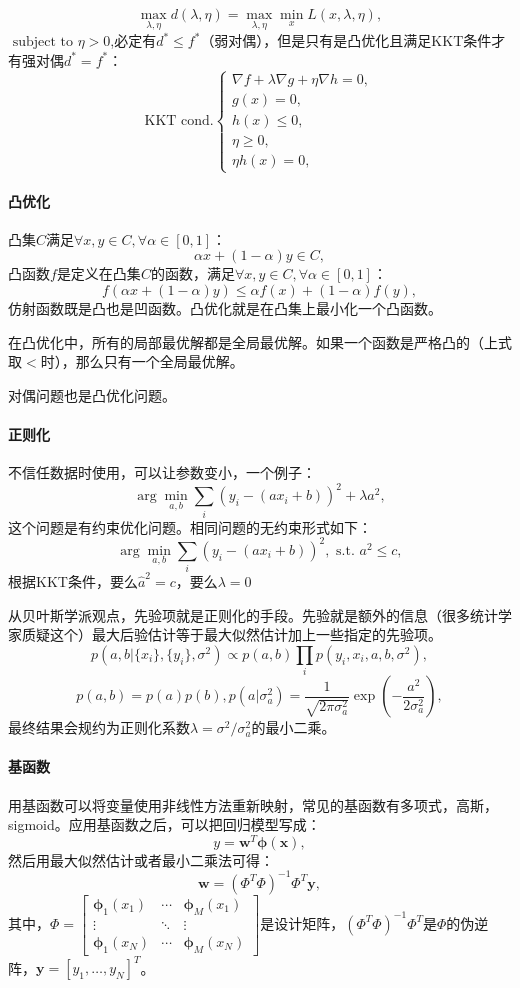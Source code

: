 $$\max_{\lambda,\eta} d(\lambda,\eta)=\max_{\lambda,\eta}\min_xL(x,\lambda,\eta),$$
$\text{ subject to }\eta>0$,必定有$d^*\le f^*$（弱对偶），但是只有是凸优化且满足KKT条件才有强对偶$d^* = f^*$：
$$\text{KKT cond.} \left\{\begin{array}{l}
\nabla f + \lambda\nabla g + \eta\nabla h = 0, \\
g(x) = 0, \\
h(x) \le 0, \\
\eta \ge 0, \\
\eta h(x) = 0,
\end{array} \right.$$

\paragraph{凸优化} 凸集$C$满足$\forall x,y \in C, \forall \alpha \in [0,1]$：
$$\alpha x + (1-\alpha)y \in C,$$
凸函数$f$是定义在凸集$C$的函数，满足$\forall x,y \in C, \forall \alpha \in [0,1]$：
$$f(\alpha x + (1-\alpha)y) \le \alpha f(x) + (1-\alpha)f(y),$$
仿射函数既是凸也是凹函数。凸优化就是在凸集上最小化一个凸函数。

在凸优化中，所有的局部最优解都是全局最优解。如果一个函数是严格凸的（上式取$<$时），那么只有一个全局最优解。

对偶问题也是凸优化问题。

\paragraph{正则化} 不信任数据时使用，可以让参数变小，一个例子：$$\arg\min_{a,b}\sum_i(y_i-(ax_i + b))^2+\lambda a^2,$$
这个问题是有约束优化问题。相同问题的无约束形式如下：
$$\arg\min_{a,b}\sum_i(y_i-(ax_i + b))^2,\text{ s.t. }a^2 \le c,$$根据KKT条件，要么$\hat{a}^2 = c$，要么$\lambda = 0$

从贝叶斯学派观点，先验项就是正则化的手段。先验就是额外的信息（很多统计学家质疑这个）最大后验估计等于最大似然估计加上一些指定的先验项。
$$p(a,b|\{x_i\}, \{y_i\}, \sigma^2) \propto p(a,b) \prod_i p(y_i, x_i, a, b, \sigma^2),$$
$$p(a,b) = p(a)p(b), p(a|\sigma_a^2) = \frac{1}{\sqrt{2\pi\sigma_a^2}}\exp(-\frac{a^2}{2\sigma_a^2}),$$
最终结果会规约为正则化系数$\lambda = \sigma^2/\sigma_a^2$的最小二乘。

\paragraph{基函数}
用基函数可以将变量使用非线性方法重新映射，常见的基函数有多项式，高斯，sigmoid。应用基函数之后，可以把回归模型写成：
$$y = \bm{w}^T\bm\phi(\bm{x}),$$
然后用最大似然估计或者最小二乘法可得：
$$\bm w = (\Phi^T\Phi)^{-1}\Phi^T\bm y,$$其中，$\Phi = \begin{bmatrix}
\bm\phi_1(x_1) & \cdots & \bm\phi_M(x_1) \\
\vdots & \ddots & \vdots \\
\bm\phi_1(x_N) & \cdots & \bm\phi_M(x_N)
\end{bmatrix}$是设计矩阵，$(\Phi^T\Phi)^{-1}\Phi^T$是$\Phi$的伪逆阵，$\bm y = [y_1, \ldots, y_N]^T$。

